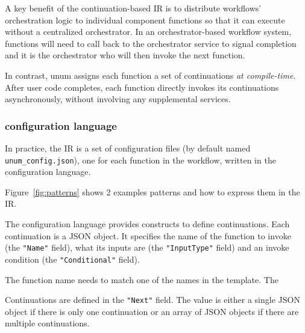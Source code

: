 A key benefit of the continuation-based IR is to distribute workflows'
orchestration logic to individual component functions so that it can execute
without a centralized orchestrator. In an orchestrator-based workflow system,
functions will need to call back to the orchestrator service to signal
completion and it is the orchestrator who will then invoke the next function.

In contrast, unum assigns each function a set of continuations \emph{at
compile-time}. After user code completes, each function directly invokes its
continuations asynchronously, without involving any supplemental services.





\subsubsection{\name{} configuration language}\label{sec:design-config-lang}

In practice, the \name{} IR is a set of configuration files (by default named
\texttt{unum\_config.json}), one for each function in the workflow, written in
the \name{} configuration language.

Figure~\ref{fig:patterns} shows 2 examples patterns and how to express them in
the \name{} IR.

The configuration language provides constructs to define continuations. Each
continuation is a JSON object. It specifies the name of the function to invoke
(the \texttt{"Name"} field), what its inputs are (the \texttt{"InputType"}
field) and an invoke condition (the \texttt{"Conditional"} field).

The function name needs to match one of the names in the \name{} template. The 

Continuations are defined in the \texttt{"Next"} field. The value is
either a single JSON object if there is only one continuation or an array
of JSON objects if there are multiple continuations.


